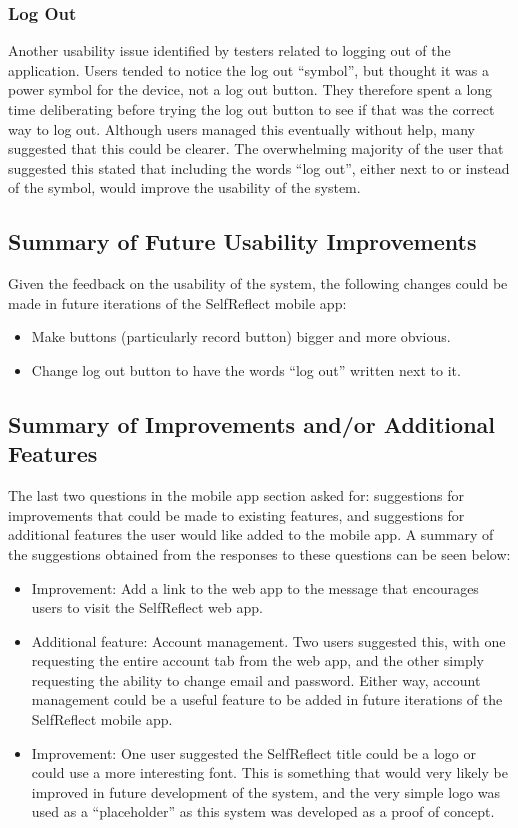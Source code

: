 \documentclass[11pt,openright,a4paper]{report}
\begin{document}
\subsubsection{Log Out}
Another usability issue identified by testers related to logging out of the application. Users tended to notice the log out \enquote{symbol}, but thought it was a power symbol for the device, not a log out button. They therefore spent a long time deliberating before trying the log out button to see if that was the correct way to log out. Although users managed this eventually without help, many suggested that this could be clearer. The overwhelming majority of the user that suggested this stated that including the words \enquote{log out}, either next to or instead of the symbol, would improve the usability of the system.

\subsection{Summary of Future Usability Improvements} \label{subsec:mobusabilityimp}
Given the feedback on the usability of the system, the following changes could be made in future iterations of the SelfReflect mobile app:
\begin{itemize}
\item Make buttons (particularly record button) bigger and more obvious.
\item Change log out button to have the words \enquote{log out} written next to it.
\end{itemize}

\subsection{Summary of Improvements and/or Additional Features}
The last two questions in the mobile app section asked for: suggestions for improvements that could be made to existing features, and suggestions for additional features the user would like added to the mobile app. A summary of the suggestions obtained from the responses to these questions can be seen below:
\begin{itemize}
\item Improvement: Add a link to the web app to the message that encourages users to visit the SelfReflect web app.
\item Additional feature: Account management. Two users suggested this, with one requesting the entire account tab from the web app, and the other simply requesting the ability to change email and password. Either way, account management could be a useful feature to be added in future iterations of the SelfReflect mobile app.
\item Improvement: One user suggested the SelfReflect title could be a logo or could use a more interesting font. This is something that would very likely be improved in future development of the system, and the very simple logo was used as a \enquote{placeholder} as this system was developed as a proof of concept.
\end{itemize}
\end{document}

